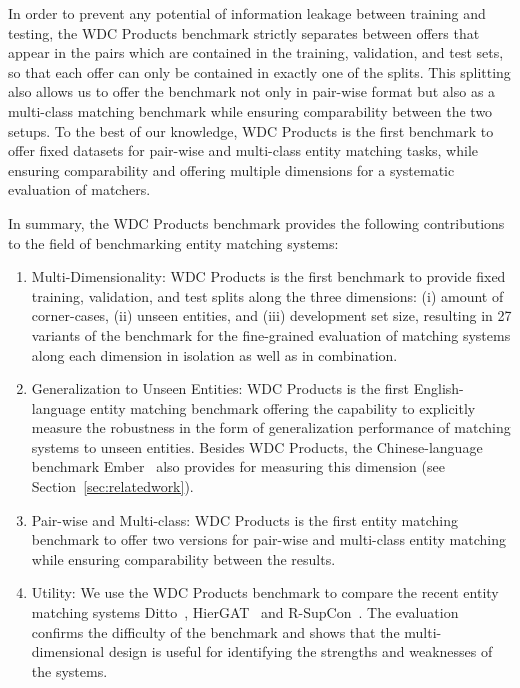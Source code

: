 \documentclass[sigconf,edbt]{acmart-edbt2024}
\begin{document}
In order to prevent any potential of information leakage between training and testing, the WDC Products benchmark strictly separates between offers that appear in the pairs which are contained in the training, validation, and test sets, so that each offer can only be contained in exactly one of the splits. This splitting also allows us to offer the benchmark not only in pair-wise format but also as a multi-class matching benchmark while ensuring comparability between the two setups. To the best of our knowledge, WDC Products is the first benchmark to offer fixed datasets for pair-wise and multi-class entity matching tasks, while ensuring comparability and offering multiple dimensions for a systematic evaluation of matchers. 

In summary, the WDC Products benchmark provides the following contributions to the field of benchmarking entity matching systems:
\begin{enumerate}
\item Multi-Dimensionality: WDC Products is the first benchmark to provide fixed training, validation, and test splits along the three dimensions: (i) amount of corner-cases, (ii) unseen entities, and (iii) development set size, resulting in 27 variants of the benchmark for the fine-grained evaluation of matching systems along each dimension in isolation as well as in combination.
\item Generalization to Unseen Entities: WDC Products is the first English-language entity matching benchmark offering the capability to explicitly measure the robustness in the form of generalization performance of matching systems to unseen entities. Besides WDC Products, the Chinese-language benchmark Ember~\cite{wangBridgingGapReality2022a} also provides for measuring this dimension (see Section~\ref{sec:relatedwork}).
\item Pair-wise and Multi-class: WDC Products is the first entity matching benchmark to offer two versions for pair-wise and multi-class entity matching while ensuring comparability between the results.
\item Utility: We use the WDC Products benchmark to compare the recent entity matching systems Ditto~\cite{liDeepEntityMatching2020}, HierGAT~\cite{yaoEntityResolutionHierarchical2022} and R-SupCon~\cite{peetersSupervisedContrastiveLearning2022a}. The evaluation confirms the difficulty of the benchmark and shows that the multi-dimensional design is useful for identifying the strengths and weaknesses of the systems.
\end{enumerate}
\end{document}
